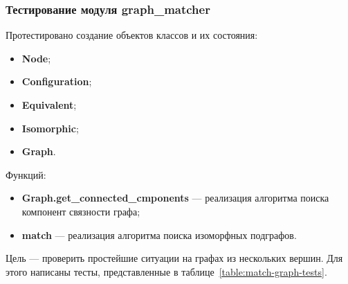 \subsubsection{Тестирование модуля graph\_matcher}

Протестировано создание объектов классов и их состояния:
\begin{itemize}
\item \textbf{Node};
\item \textbf{Configuration};
\item \textbf{Equivalent};
\item \textbf{Isomorphic};
\item \textbf{Graph}.
\end{itemize}

Функций:
\begin{itemize}
\item \textbf{Graph.get\_connected\_cmponents} --- реализация алгоритма поиска
компонент связности графа;
\item \textbf{match} --- реализация алгоритма поиска изоморфных подграфов.
\end{itemize}

Цель --- проверить простейшие ситуации на графах из нескольких вершин.
Для этого написаны тесты, представленные в таблице~\ref{table:match-graph-tests}.

